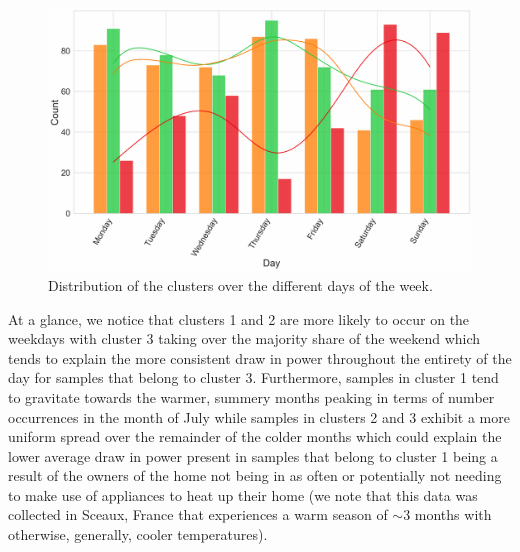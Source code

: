 \begin{adjustwidth}{-1.65cm}{-0.0cm}
\begin{enumerate}[label=Step 2.\arabic*:, leftmargin=*]
        \begin{figure}[H]
            \centering
            \includegraphics[width=\textwidth]{Images/Chapter 6/Stage 2/UCID/UCID-HDBSCAN-4.pdf}
            \caption{Distribution of the clusters over the different days of the week.}
            \label{fig:UCID-HDBSCAN-4}
        \end{figure}
        
        \noindent \newline At a glance, we notice that clusters 1 and 2 are more likely to occur on the weekdays with cluster 3 taking over the majority share of the weekend which tends to explain the more consistent draw in power throughout the entirety of the day for samples that belong to cluster 3. Furthermore, samples in cluster 1 tend to gravitate towards the warmer, summery months peaking in terms of number occurrences in the month of July while samples in clusters 2 and 3 exhibit a more uniform spread over the remainder of the colder months which could explain the lower average draw in power present in samples that belong to cluster 1 being a result of the owners of the home not being in as often or potentially not needing to make use of appliances to heat up their home (we note that this data was collected in Sceaux, France that experiences a warm season of $\sim \! 3$  months with otherwise, generally, cooler temperatures). 
        

\end{enumerate}
\end{adjustwidth}
